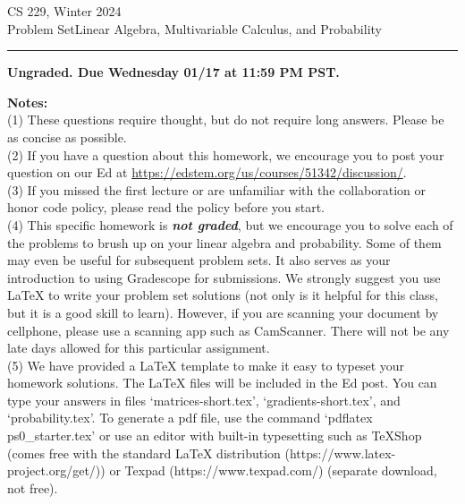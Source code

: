 \documentclass{article}
\newcommand{\ruleskip}{\bigskip\hrule\bigskip}
\begin{document}
\pagestyle{myheadings} 

\solutionsfalse

{\huge
\noindent CS 229, Winter 2024\\
Problem SetLinear Algebra, Multivariable Calculus, and Probability\\
}

\ruleskip

{\bf Ungraded. Due Wednesday 01/17 at 11:59 PM PST.}

{\bf Notes:} \\ (1) These questions require thought, but do not require long
 answers. Please be as concise as possible. \\ (2) If you have a question about
 this homework, we encourage you to post your question on our Ed at \url{https://edstem.org/us/courses/51342/discussion/}.  \\ (3) If you missed the
 first lecture or are unfamiliar with the collaboration or honor code policy,
 please read the policy before you start. \\ (4) This specific homework is {\bf{\emph{not graded}}}, but we encourage you
to solve each of the problems to brush up on your linear algebra and probability.
Some of them may even be useful for subsequent problem sets. It also
serves as your introduction to using Gradescope for submissions. We strongly suggest you use LaTeX to write your problem set solutions (not only is it helpful for this class, but it is a good skill to learn). However, if you are scanning your document by cellphone, please use a scanning app such as
CamScanner. There will not be any late days allowed for this particular assignment.
\\ (5) We have provided a LaTeX template to make it easy to typeset your homework solutions. The LaTeX files will be included in the Ed post. You can type your answers in files `matrices-short.tex', `gradients-short.tex', and `probability.tex'. To generate a pdf file, use the command `pdflatex ps0\_starter.tex' or use an editor with built-in typesetting such as TeXShop (comes free with the standard LaTeX distribution (https://www.latex-project.org/get/)) or Texpad (https://www.texpad.com/) (separate download, not free).
\smallskip
\end{document}
